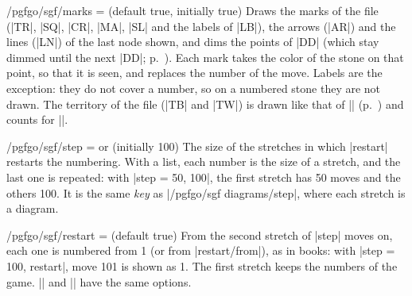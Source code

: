 \begin{key}{/pgfgo/sgf/marks =  (default true, initially true)}
	Draws the marks of the file (|TR|, |SQ|, |CR|, |MA|, |SL| and the labels of |LB|), the arrows (|AR|) and the lines (|LN|) of the last node shown, and dims the points of |DD| (which stay dimmed until the next |DD|; p.~\pageref{subsec:flechas}). Each mark takes the color of the stone on that point, so that it is seen, and replaces the number of the move. Labels are the exception: they do not cover a number, so on a numbered stone they are not drawn. The territory of the file (|TB| and |TW|) is drawn like that of |\territory| (p.~\pageref{subsec:territorio}) and counts for |\pgfgoscore|.

	\begin{codeexample}[]
		\begin{goban}[sgf size = variations]
		\end{goban}

		\begin{goban}[sgf size = variations]
		\end{goban}
	\end{codeexample}
\end{key}

\begin{key}{/pgfgo/sgf/step =  or  (initially 100)}
	The size of the stretches in which |restart| restarts the numbering. With a list, each number is the size of a stretch, and the last one is repeated: with |step = {50, 100}|, the first stretch has 50 moves and the others 100. It is the same \emph{key} as |/pgfgo/sgf diagrams/step|, where each stretch is a diagram.
\end{key}

\begin{key}{/pgfgo/sgf/restart =  (default true)}
	From the second stretch of |step| moves on, each one is numbered from 1 (or from |restart/from|), as in books: with |step = 100, restart|, move 101 is shown as 1. The first stretch keeps the numbers of the game. |\sgfanimation| and |\sgfdiagrams| have the same options.

	\begin{codeexample}[]
		\begin{goban}[sgf size = variations]
		\end{goban}

		\begin{goban}[sgf size = variations]
		\end{goban}
	\end{codeexample}
\end{key}


